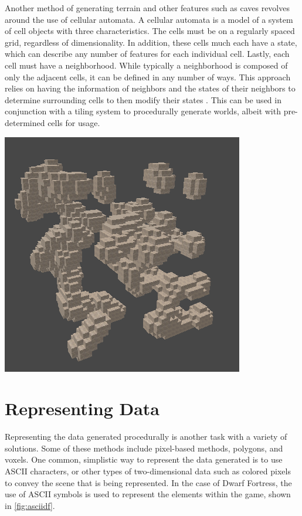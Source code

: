 \documentclass[10pt]{report}
\begin{document}
		Another method of generating terrain and other features such as caves \cite{10.1145/1814256.1814266} revolves around the use of cellular automata. A cellular automata is a model of a system of cell objects with three characteristics. The cells must be on a regularly spaced grid, regardless of dimensionality. In addition, these cells much each have a state, which can describe any number of features for each individual cell. Lastly, each cell must have a neighborhood. While typically a neighborhood is composed of only the adjacent cells, it can be defined in any number of ways. This approach relies on having the information of neighbors and the states of their neighbors to determine surrounding cells to then modify their states \cite{nature-of-code}. This can be used in conjunction with a tiling system to procedurally generate worlds, albeit with pre-determined cells for usage.
		
		\begin{minipage}{\textwidth}
			\centering
			\includegraphics[scale=1]{cellular-automata-cave}
			\label{fig:ca-cave}
		\end{minipage}
		
		\section{Representing Data}
	
		Representing the data generated procedurally is another task with a variety of solutions. Some of these methods include pixel-based methods, polygons, and voxels. One common, simplistic way to represent the data generated is to use ASCII characters, or other types of two-dimensional data such as colored pixels to convey the scene that is being represented. In the case of Dwarf Fortress, the use of ASCII symbols is used to represent the elements within the game, shown in \autoref{fig:asciidf}.
		
\end{document}
